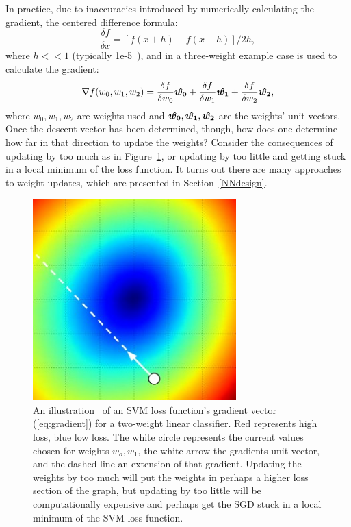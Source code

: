 In practice, due to inaccuracies introduced by numerically calculating the gradient, the centered difference formula:
\begin{equation}
\label{eq:centdiffform}
\frac{\delta f}{\delta x} =[f(x+h) - f(x-h)] / 2 h,
\end{equation}
where $h << 1$ (typically 1e-5~\cite{cs231}), and in a three-weight example case is used to calculate the gradient:
\begin{equation}
\label{eq:gradient}
\nabla f(w_0,w_1,w_2) = \frac{\delta f}{\delta w_0}\boldsymbol{\hat{\textbf{$w_0$}}} + \frac{\delta f}{\delta w_1}\boldsymbol{\hat{\textbf{$w_1$}}} + \frac{\delta f}{\delta w_2}\boldsymbol{\hat{\textbf{$w_2$}}},
\end{equation}
where $w_0, w_1, w_2$ are weights used and $\boldsymbol{\hat{\textbf{$w_0$}}}, \boldsymbol{\hat{\textbf{$w_1$}}}, \boldsymbol{\hat{\textbf{$w_2$}}}$ are the weights' unit vectors. Once the descent vector has been determined, though, how does one determine how far in that direction to update the weights? Consider the consequences of updating by too much as in Figure~\ref{fig:updatetoomuch}, or updating by too little and getting stuck in a local minimum of the loss function. It turns out there are many approaches to weight updates, which are presented in Section~\ref{NNdesign}.

\begin{figure}[ht!]
	\centering \includegraphics[width=0.7\textwidth,keepaspectratio]{figs/stepsize.jpg}
    \caption{An illustration~\cite{cs231} of an SVM loss function's gradient vector (\ref{eq:gradient}) for a two-weight linear classifier. Red represents high loss, blue low loss. The white circle represents the current values chosen for weights $w_o, w_1$, the white arrow the gradients unit vector, and the dashed line an extension of that gradient. Updating the weights by too much will put the weights in perhaps a higher loss section of the graph, but updating by too little will be computationally expensive and perhaps get the SGD stuck in a local minimum of the SVM loss function.}
\label{fig:updatetoomuch}
\end{figure}

